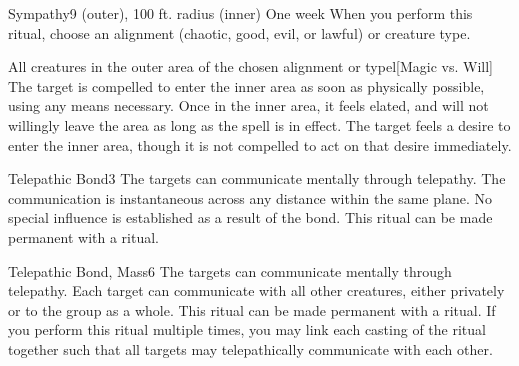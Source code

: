 \begin{spellsection}{Sympathy}{9}
\spellrng{\rngclose}
 (outer), 100 ft. radius (inner)
\spelldur One week \dismissable
\spellspecial When you perform this ritual, choose an alignment (chaotic, good, evil, or lawful) or creature type.
\begin{spelltargets}{All creatures in the outer area of the chosen alignment or type}l[Magic vs. Will]
    \spellsuccess The target is compelled to enter the inner area as soon as physically possible, using any means necessary. Once in the inner area, it feels elated, and will not willingly leave the area as long as the spell is in effect.
    \spellfailure The target feels a desire to enter the inner area, though it is not compelled to act on that desire immediately.
\end{spelltargets}
\end{spellsection}

\begin{spellsection}{Telepathic Bond}{3}
\spellrng{\rngclose}
\spelldur \durext \dismissable
\spellline
\spelleffect The targets can communicate mentally through telepathy. The communication is instantaneous across any distance within the same plane.
\spellnotes No special influence is established as a result of the bond. This ritual can be made permanent with a  ritual.
\end{spellsection}

\begin{spellsection}{Telepathic Bond, Mass}{6}
\spelldur \durext \dismissable
{}
\spellline
\spelleffect The targets can communicate mentally through telepathy. Each target can communicate with all other creatures, either privately or to the group as a whole.
\spellnotes This ritual can be made permanent with a  ritual. If you perform this ritual multiple times, you may link each casting of the ritual together such that all targets may telepathically communicate with each other. 
\end{spellsection}

